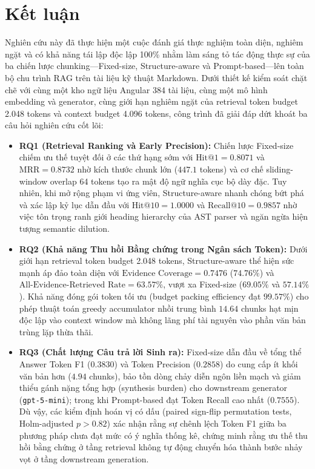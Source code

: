 
\section{Kết luận}
\label{sec:conclusion}

Nghiên cứu này đã thực hiện một cuộc đánh giá thực nghiệm toàn diện, nghiêm ngặt và có khả năng tái lập độc lập 100\% nhằm làm sáng tỏ tác động thực sự của ba chiến lược chunking---Fixed-size, Structure-aware và Prompt-based---lên toàn bộ chu trình RAG trên tài liệu kỹ thuật Markdown. Dưới thiết kế kiểm soát chặt chẽ với cùng một kho ngữ liệu Angular 384 tài liệu, cùng một mô hình embedding và generator, cùng giới hạn nghiêm ngặt của retrieval token budget 2.048 tokens và context budget 4.096 tokens, công trình đã giải đáp dứt khoát ba câu hỏi nghiên cứu cốt lõi:

\begin{itemize}
    \item \textbf{RQ1 (Retrieval Ranking và Early Precision):} Chiến lược Fixed-size chiếm ưu thế tuyệt đối ở các thứ hạng sớm với $\text{Hit@1} = 0.8071$ và $\text{MRR} = 0.8732$ nhờ kích thước chunk lớn ($447.1$ tokens) và cơ chế sliding-window overlap 64 tokens tạo ra mật độ ngữ nghĩa cục bộ dày đặc. Tuy nhiên, khi mở rộng phạm vi ứng viên, Structure-aware nhanh chóng bứt phá và xác lập kỷ lục dẫn đầu với $\text{Hit@10} = 1.0000$ và $\text{Recall@10} = 0.9857$ nhờ việc tôn trọng ranh giới heading hierarchy của AST parser và ngăn ngừa hiện tượng semantic dilution.
    
    \item \textbf{RQ2 (Khả năng Thu hồi Bằng chứng trong Ngân sách Token):} Dưới giới hạn retrieval token budget 2.048 tokens, Structure-aware thể hiện sức mạnh áp đảo toàn diện với $\text{Evidence Coverage} = 0.7476$ ($74.76\%$) và $\text{All-Evidence-Retrieved Rate} = 63.57\%$, vượt xa Fixed-size ($69.05\%$ và $57.14\%$). Khả năng đóng gói token tối ưu (budget packing efficiency đạt $99.57\%$) cho phép thuật toán greedy accumulator nhồi trung bình $14.64$ chunks hạt mịn độc lập vào context window mà không lãng phí tài nguyên vào phần văn bản trùng lặp thừa thãi.
    
    \item \textbf{RQ3 (Chất lượng Câu trả lời Sinh ra):} Fixed-size dẫn đầu về tổng thể Answer Token F1 ($0.3830$) và Token Precision ($0.2858$) do cung cấp ít khối văn bản hơn ($4.94$ chunks), bảo tồn dòng chảy diễn ngôn liền mạch và giảm thiểu gánh nặng tổng hợp (synthesis burden) cho downstream generator (\texttt{gpt-5-mini}); trong khi Prompt-based đạt Token Recall cao nhất ($0.7555$). Dù vậy, các kiểm định hoán vị có dấu (paired sign-flip permutation tests, Holm-adjusted $p > 0.82$) xác nhận rằng sự chênh lệch Token F1 giữa ba phương pháp chưa đạt mức có ý nghĩa thống kê, chứng minh rằng ưu thế thu hồi bằng chứng ở tầng retrieval không tự động chuyển hóa thành bước nhảy vọt ở tầng downstream generation.
\end{itemize}

